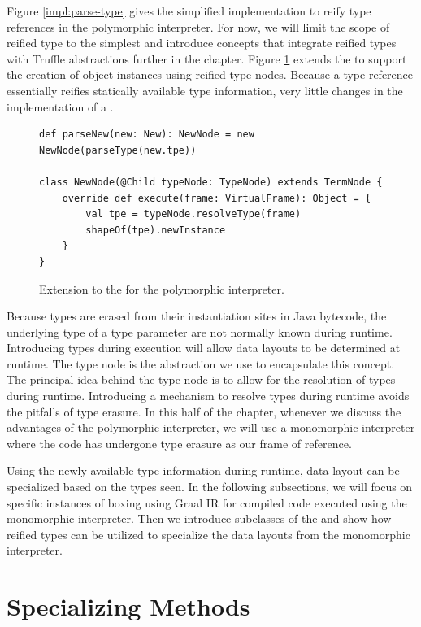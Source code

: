 Figure \ref{impl:parse-type} gives the simplified implementation to reify type references in the polymorphic interpreter.
For now, we will limit the scope of reified type to the simplest and introduce concepts that integrate reified types with Truffle abstractions further in the chapter.
Figure \ref{impl:extend-new} extends the  to support the creation of object instances using reified type nodes.
Because a type reference essentially reifies statically available type information, very little changes in the implementation of a .

\begin{figure}[!htb]
\begin{verbatim}
def parseNew(new: New): NewNode = new NewNode(parseType(new.tpe))	

class NewNode(@Child typeNode: TypeNode) extends TermNode {
	override def execute(frame: VirtualFrame): Object = {
		val tpe = typeNode.resolveType(frame)
		shapeOf(tpe).newInstance
	}
}
\end{verbatim}
\caption{Extension to the  for the polymorphic interpreter.}
\label{impl:extend-new}
\end{figure}

Because types are erased from their instantiation sites in Java bytecode, the underlying type of a type parameter are not normally known during runtime. 
Introducing types during execution will allow data layouts to be determined at runtime.
The type node is the abstraction we use to encapsulate this concept.
The principal idea behind the type node is to allow for the resolution of types during runtime.
Introducing a mechanism to resolve types during runtime avoids the pitfalls of type erasure.
In this half of the chapter, whenever we discuss the advantages of the polymorphic interpreter, we will use a monomorphic interpreter where the code has undergone type erasure as our frame of reference.

Using the newly available type information during runtime, data layout can be specialized based on the types seen.
In the following subsections, we will focus on specific instances of boxing using Graal IR for compiled code executed using the monomorphic interpreter.
Then we introduce subclasses of the  and show how reified types can be utilized to specialize the data layouts from the monomorphic interpreter.

\section{Specializing Methods}

